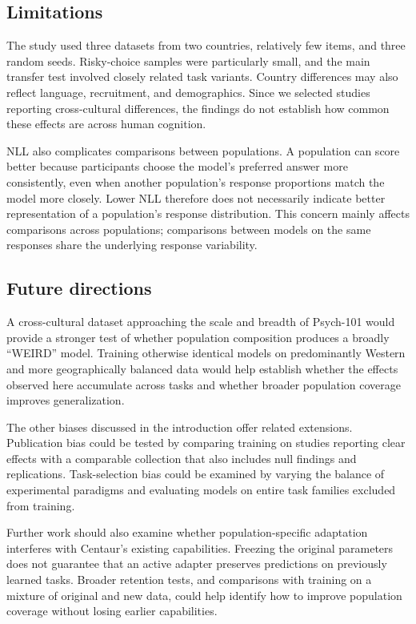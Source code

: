 \subsection{Limitations}

The study used three datasets from two countries, relatively few items, and three random seeds. Risky-choice samples were particularly small, and the main transfer test involved closely related task variants. Country differences may also reflect language, recruitment, and demographics. Since we selected studies reporting cross-cultural differences, the findings do not establish how common these effects are across human cognition.

NLL also complicates comparisons between populations. A population can score better because participants choose the model's preferred answer more consistently, even when another population's response proportions match the model more closely. Lower NLL therefore does not necessarily indicate better representation of a population's response distribution. This concern mainly affects comparisons across populations; comparisons between models on the same responses share the underlying response variability.


\subsection{Future directions}

A cross-cultural dataset approaching the scale and breadth of Psych-101 would provide a stronger test of whether population composition produces a broadly ``WEIRD'' model. Training otherwise identical models on predominantly Western and more geographically balanced data would help establish whether the effects observed here accumulate across tasks and whether broader population coverage improves generalization.

The other biases discussed in the introduction offer related extensions. Publication bias could be tested by comparing training on studies reporting clear effects with a comparable collection that also includes null findings and replications. Task-selection bias could be examined by varying the balance of experimental paradigms and evaluating models on entire task families excluded from training.

Further work should also examine whether population-specific adaptation interferes with Centaur's existing capabilities. Freezing the original parameters does not guarantee that an active adapter preserves predictions on previously learned tasks. Broader retention tests, and comparisons with training on a mixture of original and new data, could help identify how to improve population coverage without losing earlier capabilities.
